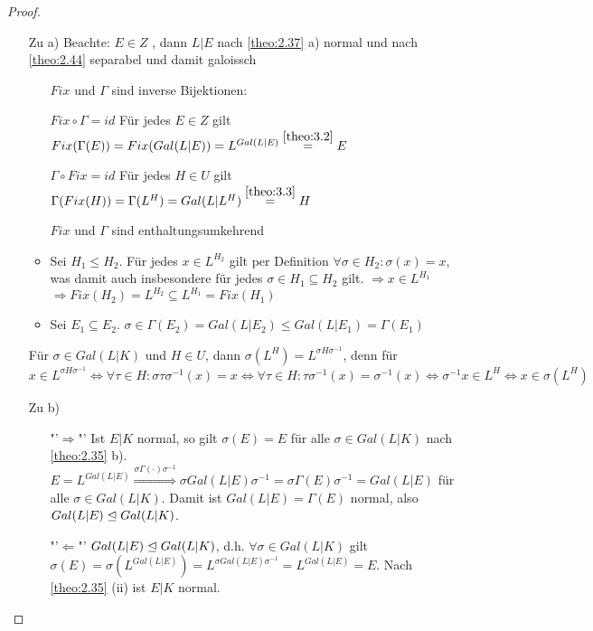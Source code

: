 \documentclass[../main.tex]{subfiles}
\begin{document}
\begin{proof} $ $
\begin{itemize}[align= left]
    \item[Zu a)]
    Beachte: $E\in Z$ , dann $L|E$ nach \cref{theo:2.37} a) normal und nach \cref{theo:2.44} separabel und damit galoissch
    
    \begin{itemize}[align=left]
        \item[]$Fix$ und $\Gamma$ sind inverse Bijektionen:
        \item[$Fix\circ \Gamma = id$] Für jedes $E\in Z$ gilt $Fix(\Gamma(E))=Fix(Gal(L|E)) = L^{Gal(L|E)}\overset{\ref{theo:3.2}}{=} E$
        \item[$\Gamma\circ Fix = id$] Für jedes $H\in U$ gilt $\Gamma(Fix(H)) = \Gamma(L^H) = Gal(L|L^H)\overset{\ref{theo:3.3}}{=}H$
    \end{itemize}
    
    \begin{itemize}[label=•,align=left]
        \item[$Fix$ und $\Gamma$ sind enthaltungsumkehrend] 
        \item Sei $H_1\leq H_2$.
        Für jedes $x\in L^{H_2}$  gilt per Definition $\forall\sigma\in H_2\colon \sigma(x)=x$, was damit auch insbesondere für jedes $\sigma\in H_1\subseteq H_2$ gilt. $\Rightarrow x\in L^{H_1}$\\
        $\Rightarrow Fix(H_2) = L^{H_2}\subseteq L^{H_1} = Fix(H_1)$
        \item 
        Sei $E_1\subseteq E_2$.
        $\sigma \in \Gamma(E_2) = Gal(L|E_2)\leq Gal(L|E_1)=\Gamma(E_1)$ 
    \end{itemize}

    
    \begin{remark*}
        Für $\sigma\in Gal(L|K)$ und $H\in U$, dann $\sigma(L^H) = L^{\sigma H \sigma^{-1}}$, denn für $x\in L^{\sigma H \sigma^{-1}} \Leftrightarrow \forall \tau \in H\colon \sigma \tau \sigma^{-1}(x)=x \Leftrightarrow \forall \tau \in H\colon \tau \sigma^{-1}(x) = \sigma^{-1}(x) \Leftrightarrow \sigma^{-1}x\in L^H \Leftrightarrow x\in \sigma(L^H)$
    \end{remark*}

    \item[Zu b)]$ $
    \begin{itemize}
        \item["'$\Rightarrow$"']
        Ist $E|K$ normal, so gilt $\sigma(E) = E$ für alle $\sigma \in Gal(L|K)$ nach \cref{theo:2.35} b).
        $E=L^{Gal(L|E)} \overset{\sigma\Gamma(\cdot)\sigma^{-1}}{\Longrightarrow} \sigma Gal(L|E) \sigma^{-1} = \sigma \Gamma(E) \sigma^{-1} = Gal(L|E)$ für alle $\sigma \in Gal(L|K)$.
        Damit ist $Gal(L|E)=\Gamma(E)$ normal, also $Gal(L|E)\trianglelefteq Gal(L|K)$.
        \item["'$\Leftarrow$"']
        $Gal(L|E) \trianglelefteq Gal(L|K)$, d.h. $\forall \sigma\in Gal(L|K)$ gilt $\sigma(E)=\sigma(L^{Gal(L|E)}) = L^{\sigma Gal(L|E) \sigma^{-1}} = L^{Gal(L|E)} = E$.
    Nach \cref{theo:2.35} (ii) ist $E|K$ normal.
    \end{itemize}


\end{itemize}
\end{proof}
\end{document}
